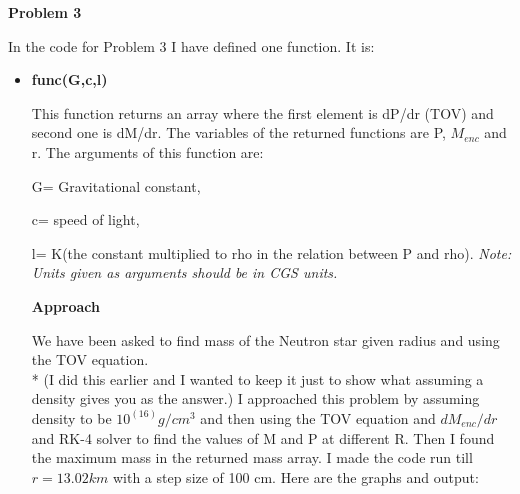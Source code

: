 \documentclass{article}
\begin{document}
\clearpage
\textbf{Problem 3}\vspace{1.5em}

In the code for Problem 3 I have defined one function. It is:
  \vspace{0.2em}
  
\begin{itemize}
\item{\textbf{func(G,c,l)}}\vspace{0.2em}

This function returns an array where the first element is dP/dr (TOV) and second one is dM/dr. The variables of the returned functions are P, $M_{enc}$ and r.
    The arguments of this function are:
      \vspace{0.2em}
      
        G= Gravitational constant,
          \vspace{0.2em}
          
        c= speed of light,
          \vspace{0.2em}
          
        l= K(the constant multiplied to rho in the relation between P and rho).
          \vspace{0.2em}
        \emph{Note: Units given as arguments should be in CGS units.}
  
  \vspace{0.2em}
  
 \textbf{Approach}
  
We have been asked to find mass of the Neutron star given radius and using the TOV equation. 
\\*
(I did this earlier and I wanted to keep it just to show what assuming a density gives you as the answer.)
\scriptsize{I approached this problem by assuming density to be $10^(16)g/cm^3$ and then using the TOV equation and $dM_{enc}/dr $ and RK-4 solver to find the values of M and P at different R. Then I found the maximum mass in the returned mass array. I made the code run till $r=13.02 km$ with a step size of 100 cm. Here are the graphs and output:} 


\end{itemize}
\end{document}
